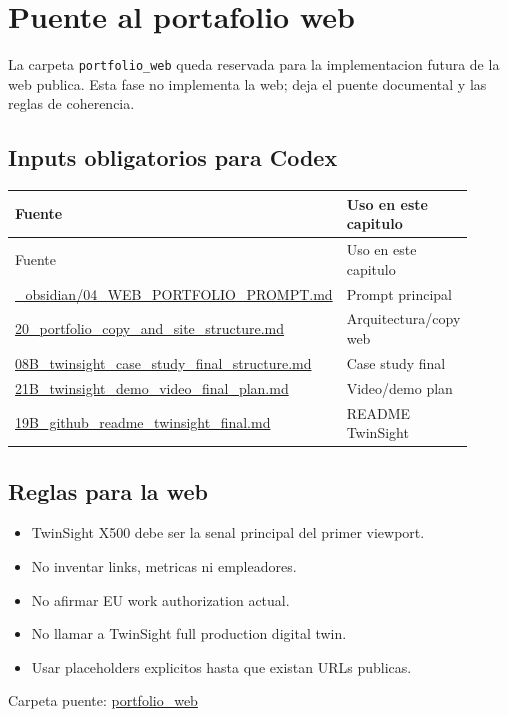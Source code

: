 \chapter{Puente al portafolio web}


La carpeta \texttt{portfolio\_web} queda reservada para la implementacion futura de la web publica. Esta fase no implementa la web; deja el puente documental y las reglas de coherencia.


\section{Inputs obligatorios para Codex}


\begin{center}
\scriptsize
\begin{longtable}{>{\raggedright\arraybackslash}p{0.455\linewidth} >{\raggedright\arraybackslash}p{0.455\linewidth}}
\toprule
Fuente & Uso en este capitulo \\
\midrule
\endfirsthead
\toprule
Fuente & Uso en este capitulo \\
\midrule
\endhead
\href{file:///E:/Laboral/_obsidian/04_WEB_PORTFOLIO_PROMPT.md}{\_obsidian/04\_WEB\_PORTFOLIO\_PROMPT.md} & Prompt principal \\
\href{file:///E:/Laboral/20_portfolio_copy_and_site_structure.md}{20\_portfolio\_copy\_and\_site\_structure.md} & Arquitectura/copy web \\
\href{file:///E:/Laboral/08B_twinsight_case_study_final_structure.md}{08B\_twinsight\_case\_study\_final\_structure.md} & Case study final \\
\href{file:///E:/Laboral/21B_twinsight_demo_video_final_plan.md}{21B\_twinsight\_demo\_video\_final\_plan.md} & Video/demo plan \\
\href{file:///E:/Laboral/19B_github_readme_twinsight_final.md}{19B\_github\_readme\_twinsight\_final.md} & README TwinSight \\
\bottomrule
\end{longtable}
\end{center}



\section{Reglas para la web}


\begin{itemize}
\item TwinSight X500 debe ser la senal principal del primer viewport.
\item No inventar links, metricas ni empleadores.
\item No afirmar EU work authorization actual.
\item No llamar a TwinSight full production digital twin.
\item Usar placeholders explicitos hasta que existan URLs publicas.
\end{itemize}


Carpeta puente: \href{file:///E:/Laboral/portfolio_web}{portfolio\_web}

